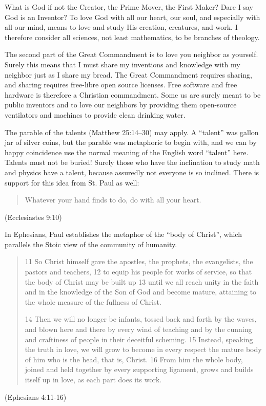 \documentclass[
	fontsize=10pt, %
	twoside=false, %
	secnumdepth=1, %
]{kaobook}
\begin{document}
What is God if not the Creator, the Prime Mover, the First Maker?
Dare I say God is an Inventor?
To love God with all our heart, our soul, and especially
with all our mind, means to love and study His creation, creatures, and work.
I therefore consider all sciences, not least mathematics, to be branches of theology.

The second part of the Great Commandment is to love you neighbor
as yourself.
Surely this means that I must share my inventions and knowledge
with my neighbor just as I share my bread.
The Great Commandment requires sharing, and sharing requires
free-libre open source licenses.
Free software and free hardware is therefore a Christian commandment.
Some us are surely
meant to be public inventors and to love our neighbors
by providing them open-source ventilators and machines to provide clean drinking water.

The parable of the talents (Matthew 25:14–30)
may apply. A ``talent'' was gallon jar of silver coins, but
the parable was metaphoric to begin with, and we can
by happy coincidence use the normal meaning of the English word
``talent'' here.
Talents must not be buried!
Surely those who have the inclination to study math and physics
have a talent, because assuredly not everyone is so inclined.
There is support for this idea from St. Paul as well:
\blockquote{
  Whatever your hand finds to do, do with all your heart.}
(Ecclesiastes 9:10)

In Ephesians, Paul establishes the metaphor of the ``body of Christ'',
which parallels the Stoic view of the community of humanity.
\blockquote{
  11 So Christ himself gave the apostles, the prophets, the evangelists, the pastors and teachers,
  12 to equip his people for works of service, so that the body of Christ may be built up
  13 until we all reach unity in the faith and in the knowledge of the Son of God and become mature, attaining to the whole measure of the fullness of Christ.

  14 Then we will no longer be infants, tossed back and forth by the waves, and blown here and there by every wind of teaching and by the cunning and craftiness of people in their deceitful scheming.
  15 Instead, speaking the truth in love, we will grow to become in every respect the mature body of him who is the head, that is, Christ.
  16 From him the whole body, joined and held together by every supporting ligament, grows and builds itself up in love, as each part does its work.
}
(Ephesians 4:11-16)
\end{document}
